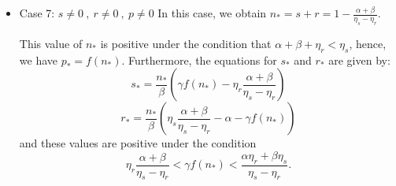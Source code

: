\begin{itemize}
	

	\item Case 7:   \(s \neq 0 \ , \ r \neq 0 \ , \ p \neq 0 \)
	In this case, we obtain $n_* = s + r = 1 - \frac{\alpha + \beta}{\eta_s - \eta_r}$.
	
	This value of $n_*$ is positive under the condition that $\alpha + \beta + \eta_r < \eta_s$, hence, we have $p_* = f(n_*)$. Furthermore, the equations for $s_*$ and $r_*$ are given by:
	$$s_* = \frac{n_*}{\beta}\left( \gamma f(n_*) - \eta_r \frac{\alpha + \beta}{\eta_s - \eta_r} \right)$$
	$$r_* = \frac{n_*}{\beta}\left( \eta_s \frac{\alpha + \beta}{\eta_s - \eta_r} - \alpha - \gamma f(n_*) \right)$$
	and these values are positive under the condition
	$$\eta_r \frac{\alpha + \beta}{\eta_s - \eta_r} < \gamma f(n_*) < \frac{\alpha \eta_r + \beta \eta_s}{\eta_s - \eta_r}.$$
	
\end{itemize}


	